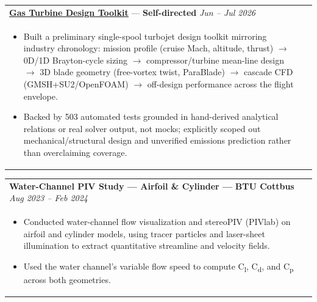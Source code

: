\documentclass[a4paper,8pt]{article}
\newcommand{\ulhref}[2]{%
  {\hypersetup{urlcolor=.}\textcolor{.}{\href{#1}{\uline{#2}}}}%
}
\begin{document}
\begin{tabularx}{\linewidth}{ @{}l r@{} }
\textbf{\ulhref{https://github.com/Sanjanakamboj/Propulsion}{Gas Turbine Design Toolkit}} — \color[HTML]{371e77}\textbf{Self-directed} \hfill \textit{Jun -- Jul 2026}\\[1pt]
\begin{minipage}[t]{\linewidth}
    \begin{itemize}[nosep,after=\strut, leftmargin=*, itemsep=1pt]
        \item Built a preliminary single-spool turbojet design toolkit mirroring industry chronology: mission profile (cruise Mach, altitude, thrust) \(\rightarrow\) 0D/1D Brayton-cycle sizing \(\rightarrow\) compressor/turbine mean-line design \(\rightarrow\) 3D blade geometry (free-vortex twist, ParaBlade) \(\rightarrow\) cascade CFD (GMSH+SU2/OpenFOAM) \(\rightarrow\) off-design performance across the flight envelope.
        \item Backed by 503 automated tests grounded in hand-derived analytical relations or real solver output, not mocks; explicitly scoped out mechanical/structural design and unverified emissions prediction rather than overclaiming coverage.
    \end{itemize}
\end{minipage}
\end{tabularx}

\begin{tabularx}{\linewidth}{ @{}l r@{} }
\textbf{Water-Channel PIV Study — Airfoil \& Cylinder — } \color[HTML]{371e77}\textbf{BTU Cottbus} \hfill \textit{Aug 2023 -- Feb 2024}\\[1pt]
\begin{minipage}[t]{\linewidth}
    \begin{itemize}[nosep,after=\strut, leftmargin=*, itemsep=1pt]
        \item Conducted water-channel flow visualization and stereoPIV (PIVlab) on airfoil and cylinder models, using tracer particles and laser-sheet illumination to extract quantitative streamline and velocity fields.
        \item Used the water channel's variable flow speed to compute C\textsubscript{l}, C\textsubscript{d}, and C\textsubscript{p} across both geometries.
    \end{itemize}
\end{minipage}
\end{tabularx}
\end{document}
